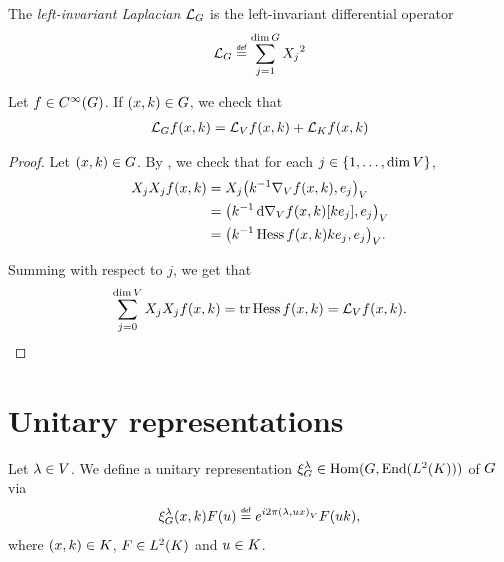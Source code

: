 \begin{definition}
\label{definition:left-invariant_Laplacian}
    The \emph{left-invariant Laplacian} $\Laplacian$ is the left-invariant differential operator
    \begin{align*}
        \Laplacian \defeq \sum_{j = 1}^{\dim \Group} \LeftDifferentialOperatorFirstOrder{X_j}^2
    \end{align*}
\end{definition}

\begin{proposition}
    Let $f \in \SmoothFunctions\Group$.
    If $(x, k) \in \Group$, we check that
    \begin{align*}
        \Laplacian f(x, k) = \Laplacian[\VectorSpace] f(x, k) + \Laplacian[\CompactGroup] f(x, k)
    \end{align*}
\end{proposition}
\begin{proof}
    Let $(x, k) \in \Group$.
    By ,
    we check that for each $j \in \{1, \dots, \dim \VectorSpace\}$,
    \begin{align*}
        \LeftDifferentialOperatorFirstOrder{X_j} \LeftDifferentialOperatorFirstOrder{X_j} f(x, k)
        &= \LeftDifferentialOperatorFirstOrder{X_j} \ip{k^{-1} \grad f(x, k)}{e_j}\\
        &= \ip{k^{-1} \dd \grad f(x, k)[k e_j]}{e_j}\\
        &= \ip{k^{-1} \Hessian f(x, k) k e_j}{e_j}.
    \end{align*}

    Summing with respect to $j$, we get that
    \begin{align*}
        \sum_{j = 0}^{\dim \VectorSpace} \LeftDifferentialOperatorFirstOrder{X_j} \LeftDifferentialOperatorFirstOrder{X_j} f(x, k)
        = \tr \Hessian f(x, k) = \Laplacian[\VectorSpace] f(x, k).
    \end{align*}
\end{proof}

\section{Unitary representations}

\begin{definition}
\label{definition:reducible_representation}
    Let $\lambda \in \VectorSpace$.
    We define a unitary representation $\Rep{\lambda} \in \Hom(\Group, \End(\Lebesgue{2}{\CompactGroup}))$ of $\Group$ via
    \begin{align}
        \Rep{\lambda} (x, k) F(u) \defeq \e^{\i \turn \ip \lambda {u x}} F(u k),
        \label{eq:reducible_representations_on_the_motion_groups}
    \end{align}
    where $(x, k) \in \CompactGroup$, $F \in \Lebesgue{2}{\CompactGroup}$ and $u \in \CompactGroup$.
\end{definition}

